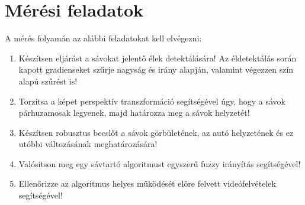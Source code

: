 \chapter{Mérési feladatok}\label{sect:LatexTools}
%

A mérés folyamán az alábbi feladatokat kell elvégezni:
\begin{enumerate}
	\item Készítsen eljárást a sávokat jelentő élek detektálására! Az éldetektálás során kapott gradienseket szűrje nagyság és irány alapján, valamint végezzen szín alapú szűrést is!
	\item Torzítsa a képet perspektív transzformáció segítségével úgy, hogy a sávok párhuzamosak legyenek, majd határozza meg a sávok helyzetét!
	\item Készítsen robusztus becslőt a sávok görbületének, az autó helyzetének és ez utóbbi változásának meghatározására!
	\item Valósítson meg egy sávtartó algoritmust egyszerű fuzzy irányítás segítségével!	
	\item Ellenőrizze az algoritmus helyes működését előre felvett videófelvételek segítségével!
\end{enumerate}

